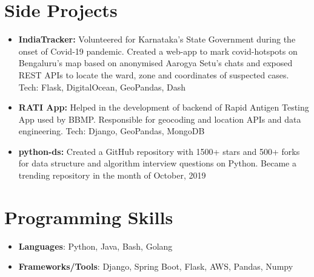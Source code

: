 \documentclass[letterpaper,11pt]{article}
\newcommand{\resumeItem}[2]{
  \item\small{
    \textbf{#1}{#2 \vspace{-2pt}}
  }
}
\newcommand{\resumeSubItem}[2]{\resumeItem{#1}{#2}\vspace{-4pt}}
\newcommand{\resumeSubHeadingListStart}{\begin{itemize}[leftmargin=*]}
\newcommand{\resumeSubHeadingListEnd}{\end{itemize}}
\begin{document}

\section{Side Projects}
  \resumeSubHeadingListStart
    \resumeSubItem{IndiaTracker: }
      {Volunteered for Karnataka's State Government during the onset of Covid-19 pandemic. Created a web-app to mark covid-hotspots on Bengaluru's map based on anonymised Aarogya Setu's chats and exposed REST APIs to locate the ward, zone and coordinates of suspected cases. Tech: Flask, DigitalOcean, GeoPandas, Dash}
      \resumeSubItem{RATI App: }
      {Helped in the development of backend of Rapid Antigen Testing App used by BBMP. Responsible for geocoding and location APIs and data engineering. Tech: Django, GeoPandas, MongoDB}
    \resumeSubItem{python-ds: }
      {Created a GitHub repository with 1500+ stars and 500+ forks for data structure and algorithm interview questions on Python. Became a trending repository in the month of October, 2019}
  \resumeSubHeadingListEnd


\section{Programming Skills}
 \resumeSubHeadingListStart
   \item{
     \textbf{Languages}{: Python, Java, Bash, Golang}
   }
   \item{
     \textbf{Frameworks/Tools}{: Django, Spring Boot, Flask, AWS, Pandas, Numpy}
   }
 \resumeSubHeadingListEnd
 
\end{document}
